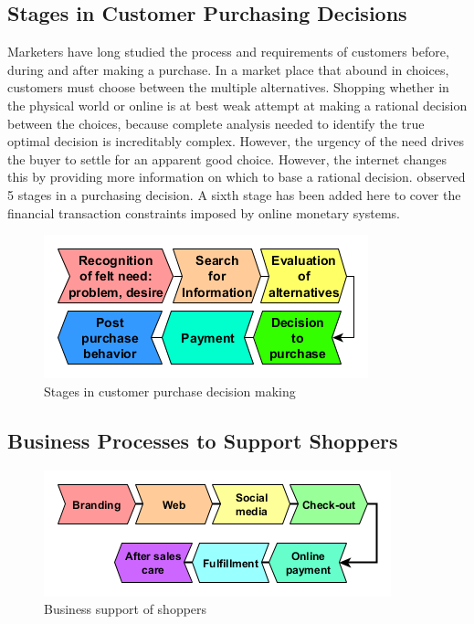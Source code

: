 \documentclass[]{book}
\begin{document}
\hypertarget{stages-in-customer-purchasing-decisions}{%
\subsection{Stages in Customer Purchasing Decisions}\label{stages-in-customer-purchasing-decisions}}

Marketers have long studied the process and requirements of customers before, during and after making a purchase. In a market place that abound in choices, customers must choose between the multiple alternatives. Shopping whether in the physical world or online is at best weak attempt at making a rational decision between the choices, because complete analysis needed to identify the true optimal decision is increditably complex. \citep{Simon1955} However, the urgency of the need drives the buyer to settle for an apparent good choice. However, the internet changes this by providing more information on which to base a rational decision. \citep{Dewey1910} observed 5 stages in a purchasing decision. A sixth stage has been added here to cover the financial transaction constraints imposed by online monetary systems.

\begin{figure}
\centering
\includegraphics{images/purchase.png}
\caption{Stages in customer purchase decision making}
\end{figure}

\hypertarget{business-processes-to-support-shoppers}{%
\subsection{Business Processes to Support Shoppers}\label{business-processes-to-support-shoppers}}

\begin{figure}
\centering
\includegraphics{images/onlinesales.png}
\caption{Business support of shoppers}
\end{figure}
\end{document}
